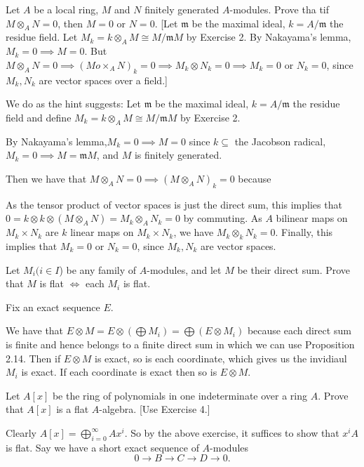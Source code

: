 \begin{questions}
	\question Let $A$ be a local ring, $M$ and $N$ finitely generated $A$-modules. Prove tha tif $M \otimes_A N = 0 $, then $M = 0$ or $N = 0$.
	[Let $\mathfrak{m}$ be the maximal ideal, $k = A / \mathfrak{m}$ the residue field. Let $M_k = k \otimes _A M \cong M / \mathfrak{m}M$ by Exercise 2. By Nakayama's lemma, $M_k = 0 \implies M = 0$. But $M \otimes_A N = 0 \implies (Mo\times _A N)_k = 0\implies M_k \otimes N_k = 0 \implies M_k = 0$ or $N_k = 0 $, since $M_k,N_k$ are vector spaces over a field.]
	\begin{solution}
		We do as the hint suggests:
		Let $\mathfrak{m}$ be the maximal ideal, $k = A / \mathfrak{m}$ the residue field and define $M_k = k \otimes _A M \cong M / \mathfrak{m}M$ by Exercise 2.

		By Nakayama's lemma,$M_k = 0 \implies M = 0$ since $k \subseteq$ the Jacobson radical, $M_k = 0\implies M = \mathfrak{m}M $, and $M$ is finitely generated.

		Then we have that $M \otimes_A N = 0 \implies (M\otimes _A N)_k = 0$ because

		As the tensor product of vector spaces is just the direct sum, this implies that $0 = k \otimes k \otimes  (M \otimes _A N) = M_k \otimes_A N_k = 0$ by commuting.
		As $A$ bilinear maps on $M_k \times N_k$ are $k$ linear maps on $M_k\times N_k $, we have $M_k \otimes _k N_k = 0$.
		Finally, this implies that $M_k = 0$ or $N_k = 0 $, since $M_k,N_k$ are vector spaces.
	\end{solution}

	\question Let $M_i (i\in I $) be any family of $A$-modules, and let $M$ be their direct sum. Prove that $M$ is flat $\iff$ each $M_i$ is flat.
	\begin{solution}
		Fix an exact sequence $E$.

		We have that $E \otimes M = E \otimes (\bigoplus M_i) = \bigoplus (E \otimes M_i)$ because each direct sum is finite and hence belongs to a finite direct sum in which we can use Proposition 2.14.
		Then if $E \otimes M$ is exact, so is each coordinate, which gives us the invidiaul $M_i$ is exact.
		If each coordinate is exact then so is $E \otimes M$.
	\end{solution}

	\question Let $A[x]$ be the ring of polynomials in one indeterminate over a ring $A$. Prove that $A[x]$ is a flat $A$-algebra. [Use Exercise 4.]
	\begin{solution}
		Clearly $A[x] = \bigoplus_{i=0}^{\infty} Ax^i$.
		So by the above exercise, it suffices to show that $x^i A$ is flat.
		Say we have a short exact sequence of $A$-modules
		\[
			0 \to B \to C \to D \to 0
		.\]


\end{solution}
\end{questions}
